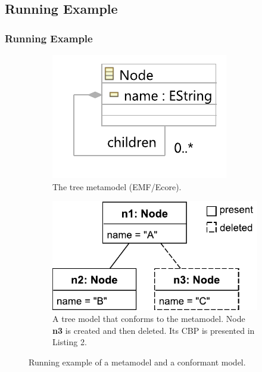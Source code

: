 \documentclass{beamer}
\begin{document}
\begin{frame}
\section{Running Example}
\frametitle{Running Example}
    \begin{figure}[ht]
        \begin{subfigure}[t]{0.45\linewidth}
            \centering
            \includegraphics[width=0.8\linewidth]{node_metamodel}
            \caption{The tree metamodel (EMF/Ecore).}
            \label{fig:tree_metamodel}
        \end{subfigure}
        \hfill
        \begin{subfigure}[t]{0.45\linewidth}
            \centering
            \includegraphics[width=\linewidth]{initial_chart}
            \caption{A tree model that conforms to the  metamodel.  Node \textbf{n3} is created and then deleted. Its CBP is presented in Listing 2.}
            \label{fig:initial_model}
        \end{subfigure}
        \caption{Running example of a metamodel and a conformant model.}
        \label{fig:append_speed}
    \end{figure}
\end{frame}
\end{document}
